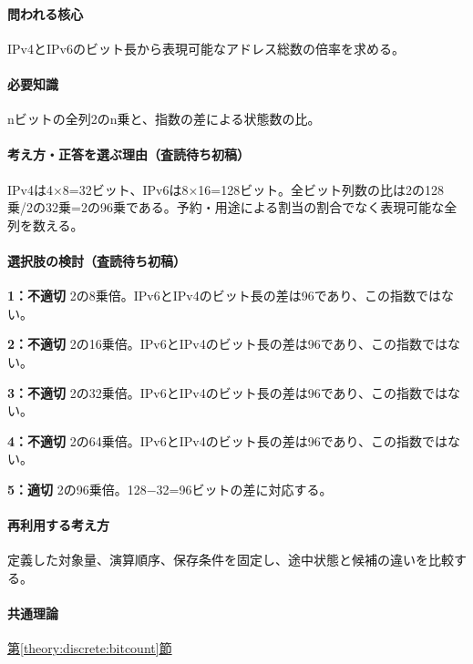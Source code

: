 \paragraph{問われる核心} IPv4とIPv6のビット長から表現可能なアドレス総数の倍率を求める。

\paragraph{必要知識} nビットの全列2のn乗と、指数の差による状態数の比。

\paragraph{考え方・正答を選ぶ理由（査読待ち初稿）} IPv4は4×8=\allowbreak{}32ビット、IPv6は8×16=\allowbreak{}128ビット。全ビット列数の比は2の128乗/2の32乗=2の96乗である。予約・用途による割当の割合でなく表現可能な全列を数える。

\paragraph{選択肢の検討（査読待ち初稿）}\mbox{}\par

\noindent\textbf{1：不適切} 2の8乗倍。IPv6とIPv4のビット長の差は96であり、この指数ではない。\par

\noindent\textbf{2：不適切} 2の16乗倍。IPv6とIPv4のビット長の差は96であり、この指数ではない。\par

\noindent\textbf{3：不適切} 2の32乗倍。IPv6とIPv4のビット長の差は96であり、この指数ではない。\par

\noindent\textbf{4：不適切} 2の64乗倍。IPv6とIPv4のビット長の差は96であり、この指数ではない。\par

\noindent\textbf{5：適切} 2の96乗倍。128−32=\allowbreak{}96ビットの差に対応する。\par

\paragraph{再利用する考え方} 定義した対象量、演算順序、保存条件を固定し、途中状態と候補の違いを比較する。

\paragraph{共通理論} \hyperref[theory:discrete:bitcount]{第\ref*{theory:discrete:bitcount}節}

